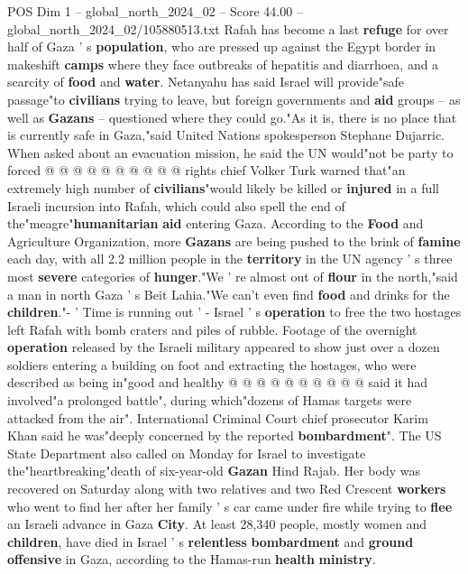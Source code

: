 \begin{textsample}{POS Dim 1 – global\_north\_2024\_02 – Score 44.00 – global\_north\_2024\_02/105880513.txt}
Rafah has become a last \textbf{refuge} for over half of Gaza ' s \textbf{population}, who are pressed up against the Egypt border in makeshift \textbf{camps} where they face outbreaks of hepatitis and diarrhoea, and a scarcity of \textbf{food} and \textbf{water}.
Netanyahu has said Israel will provide"safe passage"to \textbf{civilians} trying to leave, but foreign governments and \textbf{aid} groups -- as well as \textbf{Gazans} -- questioned where they could go."As it is, there is no place that is currently safe in Gaza,"said United Nations spokesperson Stephane Dujarric.
When asked about an evacuation mission, he said the UN would"not be party to forced @ @ @ @ @ @ @ @ @ @ rights chief Volker Turk warned that"an extremely high number of \textbf{civilians}"would likely be killed or \textbf{injured} in a full Israeli incursion into Rafah, which could also spell the end of the"meagre"\textbf{humanitarian} \textbf{aid} entering Gaza.
According to the \textbf{Food} and Agriculture Organization, more \textbf{Gazans} are being pushed to the brink of \textbf{famine} each day, with all 2.2 million people in the \textbf{territory} in the UN agency ' s three most \textbf{severe} categories of \textbf{hunger}."We ' re almost out of \textbf{flour} in the north,"said a man in north Gaza ' s Beit Lahia."We can't even find \textbf{food} and drinks for the \textbf{children}."- ' Time is running out ' - Israel ' s \textbf{operation} to free the two hostages left Rafah with bomb craters and piles of rubble.
Footage of the overnight \textbf{operation} released by the Israeli military appeared to show just over a dozen soldiers entering a building on foot and extracting the hostages, who were described as being in"good and healthy @ @ @ @ @ @ @ @ @ @ said it had involved"a prolonged battle", during which"dozens of Hamas targets were attacked from the air".
International Criminal Court chief prosecutor Karim Khan said he was"deeply concerned by the reported \textbf{bombardment}".
The US State Department also called on Monday for Israel to investigate the"heartbreaking"death of six-year-old \textbf{Gazan} Hind Rajab.
Her body was recovered on Saturday along with two relatives and two Red Crescent \textbf{workers} who went to find her after her family ' s car came under fire while trying to \textbf{flee} an Israeli advance in Gaza \textbf{City}.
At least 28,340 people, mostly women and \textbf{children}, have died in Israel ' s \textbf{relentless} \textbf{bombardment} and \textbf{ground} \textbf{offensive} in Gaza, according to the Hamas-run \textbf{health} \textbf{ministry}.

\end{textsample}
